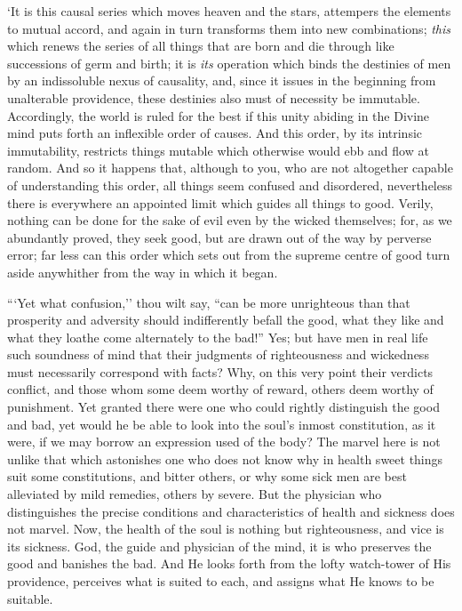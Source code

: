 \documentclass[12pt]{book}
\begin{document}
`It is this causal series which moves heaven and the stars, attempers
the elements to mutual accord, and again in turn transforms them into
new combinations; \emph{this} which renews the series of all things that are
born and die through like successions of germ and birth; it is \emph{its}
operation which binds the destinies of men by an indissoluble nexus of
causality, and, since it issues in the beginning from unalterable
providence, these destinies also must of necessity be immutable.
Accordingly, the world is ruled for the best if this unity abiding in
the Divine mind puts forth an inflexible order of causes. And this
order, by its intrinsic immutability, restricts things mutable which
otherwise would ebb and flow at random. And so it happens that, although
to you, who are not altogether capable of understanding this order, all
things seem confused and disordered, nevertheless there is everywhere an
appointed limit which guides all things to good. Verily, nothing can be
done for the sake of evil even by the wicked themselves; for, as we
abundantly proved, they seek good, but are drawn out of the way by
perverse error; far less can this order which sets out from the supreme
centre of good turn aside anywhither from the way in which it began.

```Yet what confusion,'' thou wilt say, ``can be more unrighteous than that
prosperity and adversity should indifferently befall the good, what
they like and what they loathe come alternately to the bad!'' Yes; but
have men in real life such soundness of mind that their judgments of
righteousness and wickedness must necessarily correspond with facts?
Why, on this very point their verdicts conflict, and those whom some
deem worthy of reward, others deem worthy of punishment. Yet granted
there were one who could rightly distinguish the good and bad, yet would
he be able to look into the soul's inmost constitution, as it were, if
we may borrow an expression used of the body? The marvel here is not
unlike that which astonishes one who does not know why in health sweet
things suit some constitutions, and bitter others, or why some sick men
are best alleviated by mild remedies, others by severe. But the
physician who distinguishes the precise conditions and characteristics
of health and sickness does not marvel. Now, the health of the soul is
nothing but righteousness, and vice is its sickness. God, the guide and
physician of the mind, it is who preserves the good and banishes the
bad. And He looks forth from the lofty watch-tower of His providence,
perceives what is suited to each, and assigns what He knows to be
suitable.
\end{document}
